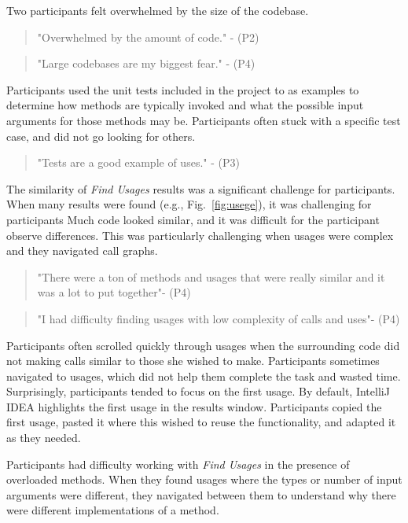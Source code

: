 \documentclass[conference]{IEEEtran}
\begin{document}
\noindent Two participants felt overwhelmed by the size of the codebase.
\begin{quote}"Overwhelmed by the amount of code." - (P2) \end{quote}
\begin{quote}"Large codebases are my biggest fear." - (P4) \end{quote}

Participants used the unit tests included in the project to as examples to determine how methods are typically invoked and what the possible input arguments for those methods may be. Participants often stuck with a specific test case, and did not go looking for others. 
\begin{quote} "Tests are a good example of uses." - (P3)\end{quote}

The similarity of \textit{Find Usages} results was a significant challenge for participants. When many results were found (e.g., Fig.~\ref{fig:usege}), it was challenging for participants 
Much code looked similar, and it was difficult for the participant observe differences. This was particularly challenging when usages were complex and they navigated call graphs.
\begin{quote}"There were a ton of methods and usages that were really similar and it was a lot to put together"- (P4)\end{quote}
\begin{quote}"I had difficulty finding usages with low complexity of calls and uses"- (P4)\end{quote}

Participants often scrolled quickly through usages when the surrounding code did not making calls similar to those she wished to make. Participants sometimes navigated to usages, which did not help them complete the task and wasted time. 
Surprisingly, participants tended to focus on the first usage. By default, IntelliJ IDEA highlights the first usage in the results window. Participants copied the first usage, pasted it where this wished to reuse the functionality, and adapted it as they needed.\par 

Participants had difficulty working with \textit{Find Usages} in the presence of overloaded methods. When they found usages where the types or number of input arguments were different, they navigated between them to understand why there were different implementations of a method.
\end{document}
